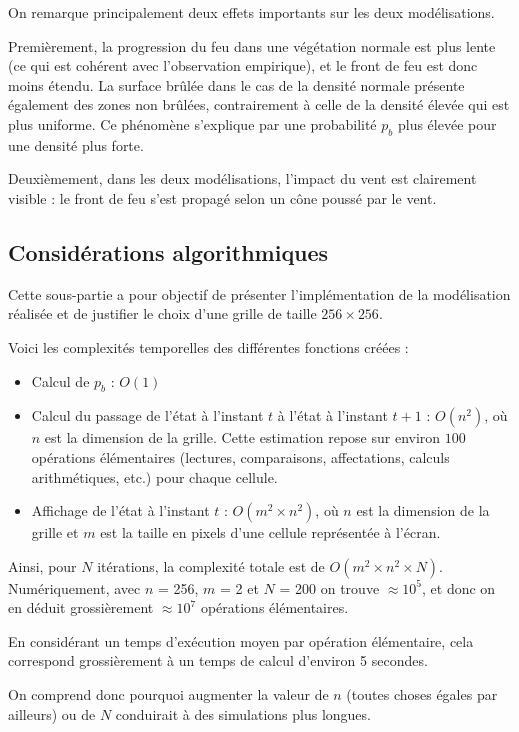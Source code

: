 \documentclass[12pt]{article}
\begin{document}
On remarque principalement deux effets importants sur les deux modélisations.

Premièrement, la progression du feu dans une végétation normale est plus lente (ce qui est cohérent avec l'observation empirique), et le front de feu est donc moins étendu. La surface brûlée dans le cas de la densité normale présente également des zones non brûlées, contrairement à celle de la densité élevée qui est plus uniforme. Ce phénomène s'explique par une probabilité $p_b$ plus élevée pour une densité plus forte.

Deuxièmement, dans les deux modélisations, l'impact du vent est clairement visible : le front de feu s'est propagé selon un cône poussé par le vent.

\subsection{Considérations algorithmiques}

Cette sous-partie a pour objectif de présenter l'implémentation de la modélisation réalisée et de justifier le choix d'une grille de taille $256 \times 256$.

Voici les complexités temporelles des différentes fonctions créées :

\begin{itemize}
    \item Calcul de $p_b$ : $O(1)$
    \item Calcul du passage de l'état à l'instant $t$ à l'état à l'instant $t+1$ : $O(n^2)$, où $n$ est la dimension de la grille. Cette estimation repose sur environ $100$ opérations élémentaires (lectures, comparaisons, affectations, calculs arithmétiques, etc.) pour chaque cellule.
    \item Affichage de l'état à l'instant $t$ : $O(m^2 \times n^2)$, où $n$ est la dimension de la grille et $m$ est la taille en pixels d'une cellule représentée à l'écran.
\end{itemize}

Ainsi, pour $N$ itérations, la complexité totale est de $O(m^2 \times n^2 \times N)$. Numériquement, avec $n$ = 256, $m$ = 2 et $N$ = 200 on trouve $\approx 10^5$, et donc on en déduit grossièrement $\approx 10^7$ opérations élémentaires.

En considérant un temps d'exécution moyen par opération élémentaire, cela correspond grossièrement à un temps de calcul d'environ 5 secondes.

On comprend donc pourquoi augmenter la valeur de $n$ (toutes choses égales par ailleurs) ou de $N$ conduirait à des simulations plus longues.
\end{document}
